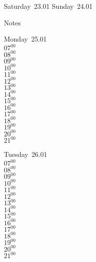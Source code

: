 \documentclass[11pt,a4paper]{book}\usepackage[]{graphicx}\usepackage[]{color}
\begin{document}
\begin{weekendbox}
  Saturday~23.01
  \tcblower
  Sunday~24.01
\end{weekendbox} %
\begin{notebox}
  Notes
\end{notebox}
\clearpage
\begin{headerbox}
\end{headerbox}
\begin{weekdaybox}
  Monday~25.01\\
  { 
  \vfill
  $07^{00}$\\
$08^{00}$\\
$09^{00}$\\
$10^{00}$\\
$11^{00}$\\
$12^{00}$\\
$13^{00}$\\
$14^{00}$\\
$15^{00}$\\
$16^{00}$\\
$17^{00}$\\
$18^{00}$\\
$19^{00}$\\
$20^{00}$\\
$21^{00}$\\
  }
\end{weekdaybox}
\begin{weekdaybox}
  Tuesday~26.01\\
  { 
  \vfill
  $07^{00}$\\
$08^{00}$\\
$09^{00}$\\
$10^{00}$\\
$11^{00}$\\
$12^{00}$\\
$13^{00}$\\
$14^{00}$\\
$15^{00}$\\
$16^{00}$\\
$17^{00}$\\
$18^{00}$\\
$19^{00}$\\
$20^{00}$\\
$21^{00}$\\
  }
\end{weekdaybox}
\end{document}
